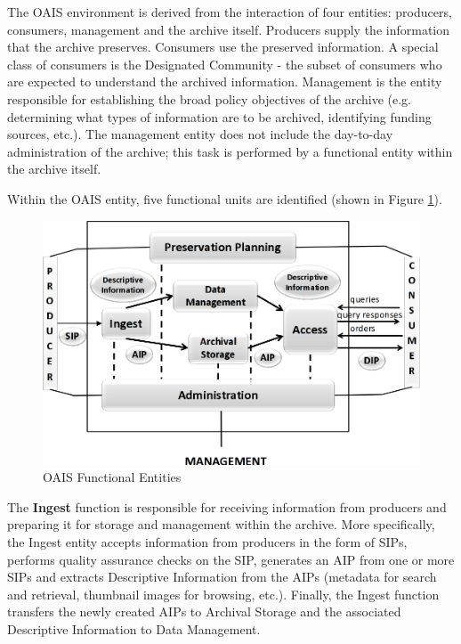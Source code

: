 The OAIS environment is derived from the interaction of four entities: producers, consumers, management and the archive itself. Producers supply the information that the archive preserves. Consumers use the preserved information. A special class of consumers is the Designated Community - the subset of consumers who are expected to understand the archived information. Management is the entity responsible for establishing the broad policy objectives of the archive (e.g. determining what types of information are to be archived, identifying funding sources, etc.). The management entity does not include the day-to-day administration of the archive; this task is performed by a functional entity within the archive itself.

Within the OAIS entity, five functional units are identified (shown in Figure \ref{fig:OAIS Functional Entities}).

\begin{figure}[h]
\centering\includegraphics[scale=0.35]{fig/oais_functional_entities}
\caption{OAIS Functional Entities}
\label{fig:OAIS Functional Entities}
\end{figure}

The \textbf{Ingest} function is responsible for receiving information from producers and preparing it for storage and management within the archive. More specifically, the Ingest entity accepts information from producers in the form of SIPs, performs quality assurance checks on the SIP, generates an AIP from one or more SIPs and extracts Descriptive Information from the AIPs (metadata for search and retrieval, thumbnail images for browsing, etc.). Finally, the Ingest function transfers the newly created AIPs to Archival Storage and the associated Descriptive Information to Data Management.

